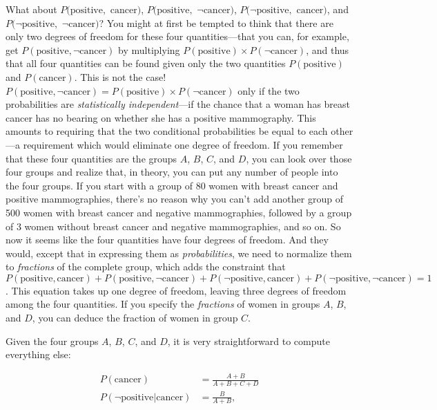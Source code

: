{ What about $P(\text{positive},$ $\text{cancer})$, $P(\text{positive},$ $\lnot\text{cancer})$,
$P(\lnot\text{positive},$ $\text{cancer})$, and
$P(\lnot\text{positive},$ $\lnot\text{cancer})$? You might at first be tempted
to think that there are only two degrees of freedom for these four
quantities---that you can, for example, get
$P(\text{positive},\lnot\text{cancer})$ by multiplying $P(\text{positive}) \times
P(\lnot\text{cancer})$, and thus that all four quantities can be found
given only the two quantities $P(\text{positive})$ and $P(\text{cancer})$. This is not
the case! $P(\text{positive},\lnot\text{cancer}) = P(\text{positive}) \times
P(\lnot\text{cancer})$ only if the two probabilities are
\textit{statistically independent}{}---if the chance that a woman has
breast cancer has no bearing on whether she has a positive mammography.
This amounts to requiring that the two conditional probabilities be
equal to each other---a requirement which would eliminate one degree of
freedom. If you remember that these four quantities are the groups $A$,
$B$, $C$, and $D$, you can look over those four groups and realize that, in
theory, you can put any number of people into the four groups. If you
start with a group of 80 women with breast cancer and positive
mammographies, there's no reason why you
can't add another group of 500 women with breast cancer
and negative mammographies, followed by a group of 3 women without
breast cancer and negative mammographies, and so on. So now it seems
like the four quantities have four degrees of freedom. And they would,
except that in expressing them as \textit{probabilities}, we need to
normalize them to \textit{fractions} of the complete group, which adds
the constraint that $P(\text{positive},
\text{cancer})+P(\text{positive},\lnot\text{cancer})+P(\lnot\text{positive},
\text{cancer})+P(\lnot\text{positive},\lnot\text{cancer}) = 1$. This equation
takes up one degree of freedom, leaving three degrees of freedom among
the four quantities. If you specify the \textit{fractions} of women in
groups $A$, $B$, and $D$, you can deduce the fraction of women in group $C$.


 Given the four groups $A$, $B$, $C$, and $D$, it is very straightforward
to compute everything else:

\begin{align*}
 P(\text{cancer}) &= \frac{A + B}{A + B + C + D} \\
 P(\lnot\text{positive}|\text{cancer}) &= \frac{B}{A + B},
\end{align*}


}
